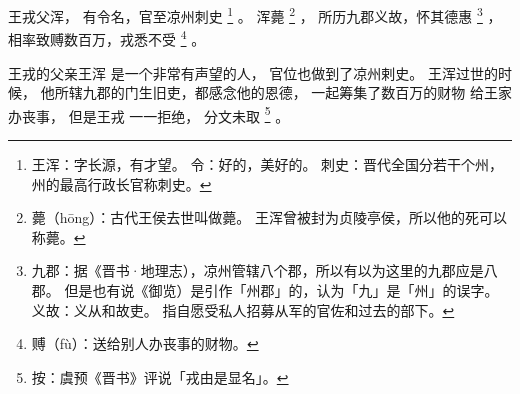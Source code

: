 
\switchcolumn*[\section{}]

王戎父浑，
有令名，官至凉州刺史%
\footnote{%
    王浑：字长源，有才望。
    令：好的，美好的。
    刺史：晋代全国分若干个州，州的最高行政长官称刺史。
}%
。
浑薨%
\footnote{%
    薨（hōng）：古代王侯去世叫做薨。
                王浑曾被封为贞陵亭侯，所以他的死可以称薨。
}%
，
所历九郡义故，怀其德惠%
\footnote{%
    九郡：据《晋书·地理志），凉州管辖八个郡，所以有以为这里的九郡应是八郡。
          但是也有说《御览）是引作「州郡」的，认为「九」是「州」的误字。
    义故：义从和故吏。
          指自愿受私人招募从军的官佐和过去的部下。
}%
，
相率致赙数百万，戎悉不受%
\footnote{%
    赙（fù）：送给别人办丧事的财物。
}%
。

\switchcolumn

王戎的父亲王浑
是一个非常有声望的人，
官位也做到了凉州剌史。
王浑过世的时候，
他所辖九郡的门生旧吏，都感念他的恩德，
一起筹集了数百万的财物
给王家办丧事，
但是王戎
一一拒绝，
分文未取%
\footnote{%
    按：虞预《晋书》评说「戎由是显名」。
}%
。


